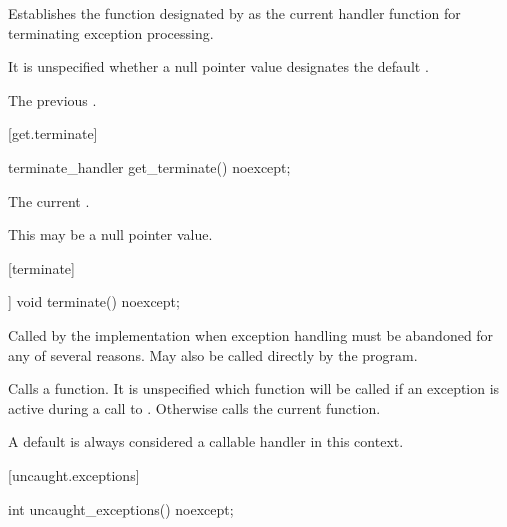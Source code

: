 \begin{itemdescr}
\pnum
\effects
Establishes the function designated by  as the current
handler function for terminating exception processing.

\pnum
\remarks
It is unspecified whether a null pointer value designates the default
.

\pnum
\returns
The previous .
\end{itemdescr}

[get.terminate]{}

%
\begin{itemdecl}
terminate_handler get_terminate() noexcept;
\end{itemdecl}

\begin{itemdescr}
\pnum
\returns
The current .
\begin{note}
This may be a null pointer value.
\end{note}
\end{itemdescr}

[terminate]{}

%
\begin{itemdecl}
[[noreturn]] void terminate() noexcept;
\end{itemdecl}

\begin{itemdescr}
\pnum
\remarks
Called by the implementation when exception
handling must be abandoned for any of several reasons.
May also be called directly by the program.

\pnum
\effects
Calls a  function. It is unspecified which
 function will be called if an exception is active
during a call to .
Otherwise calls the current  function.
\begin{note}
A
default  is always considered a callable handler in
this context.
\end{note}
\end{itemdescr}

[uncaught.exceptions]{}

%
\begin{itemdecl}
int uncaught_exceptions() noexcept;
\end{itemdecl}

